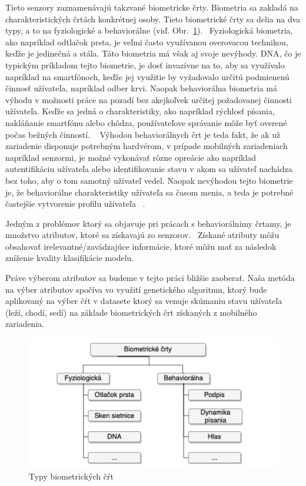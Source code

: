 \documentclass[runningheads]{llncs}
\begin{document}
Tieto senzory zaznamenávajú takzvané biometricke črty.  
Biometria sa zakladá na charakteristických črtách konkrétnej osoby. Tieto biometrické 
črty sa delia na dva typy, a to na fyziologické a behaviorálne 
(viď. Obr.~\ref{fig_rozdelenie_biometrie}).~\cite{ref_teh} Fyziologická biometria, 
ako napríklad odtlačok prsta, je veľmi často využívanou overovacou technikou, 
keďže je jedinečná a stála. Táto biometria má však aj svoje nevýhody. 
DNA, čo je typickým príkladom tejto biometrie, je dosť invazívne na to, 
aby sa využívalo napríklad na smartfónoch, keďže jej využitie by 
vyžadovalo určitú podmienenú činnosť užívateľa, napríklad odber krvi. 
Naopak behaviorálna biometria má výhodu v možnosti práce na pozadí bez akejkoľvek 
určitej požadovanej činnosti užívateľa. Keďže sa jedná o charakteristiky, 
ako napríklad rýchlosť písania, nakláňanie smartfónu alebo chôdza, 
používateľove správanie môže byť overené počas bežných činností. ~\cite{ref_teh}
Výhodou behaviorálnych črt je teda fakt, 
že ak už zariadenie disponuje potrebným hardvérom, 
v prípade mobilných zariadeniach napríklad senzormi, 
je možné vykonávať rôzne opreácie ako napríklad autentifikáciu užívateľa alebo 
identifikovanie stavu v akom sa užívateľ nachádza bez toho, aby o 
tom samotný užívateľ vedel. Naopak nevýhodou tejto biometrie je, 
že behaviorálne charakteristiky užívateľa sa časom menia, 
a teda je potrebné častejšie vytvorenie profilu užívateľa ~\cite{ref_seyd}. 

Jedným z problémov ktorý sa objavuje pri prácach s behaviorálnimy črtamy, 
je množstvo atributov, ktoré sa získavajú zo senzorov.~\cite{ref_nascimento} 
Získané atributy môžu obsahovať irelevantné/zavádzajúce informácie, ktoré
môžu mať za následok zníženie kvality klasifikácie modelu.
~\cite{ref_babatunde,ref_lu,ref_nascimento,ref_smith,ref_zhao} 

Práve výberom atributov sa 
budeme v tejto práci bližšie zaoberať. Naša metóda na výber atributov spočíva vo využití 
genetického algoritmu, ktorý bude aplikovaný na výber čŕt v datasete ktorý sa venuje skúmaniu
stavu užívateľa (leží, chodí, sedí) na základe biometrických črt získaných z 
mobilného zariadenia.~\cite{ref_dataset_anguita,ref_dataset}


\begin{figure}
\includegraphics[width=\textwidth]{image/rozdelenie_biometrie.png}
\caption{Typy biometrických čŕt~\cite{ref_teh}} \label{fig_rozdelenie_biometrie}
\end{figure}
\end{document}

